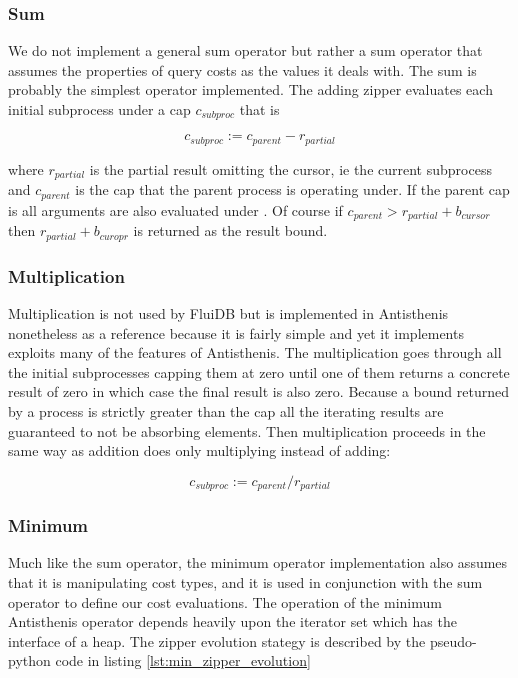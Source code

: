 \subsubsection{Sum}

We do not implement a general sum operator but rather a sum operator
that assumes the properties of query costs as the values it deals
with. The sum is probably the simplest operator implemented. The
adding zipper evaluates each initial subprocess under a cap
\(c_{subproc}\) that is

\[
c_{subproc} := c_{parent} - r_{partial}
\]

where \(r_{partial}\) is the partial result omitting the cursor, ie
the current subprocess and \(c_{parent}\) is the cap that the parent
process is operating under. If the parent cap is  all
arguments are also evaluated under . Of course if
\(c_{parent} > r_{partial} + b_{cursor}\) then \(r_{partial} +
b_{curopr}\) is returned as the result bound.

\subsubsection{Multiplication}

Multiplication is not used by FluiDB but is implemented in Antisthenis
nonetheless as a reference because it is fairly simple and yet it
implements exploits many of the features of Antisthenis. The
multiplication goes through all the initial subprocesses capping them
at zero until one of them returns a concrete result of zero in which
case the final result is also zero. Because a bound returned by a
process is strictly greater than the cap all the iterating results are
guaranteed to not be absorbing elements. Then multiplication proceeds
in the same way as addition does only multiplying instead of adding:

\[
c_{subproc} := c_{parent} / r_{partial}
\]

\subsubsection{Minimum}

Much like the sum operator, the minimum operator implementation also
assumes that it is manipulating cost types, and it is used in
conjunction with the sum operator to define our cost evaluations. The
operation of the minimum Antisthenis operator depends heavily upon the
iterator set which has the interface of a heap. The zipper evolution
stategy is described by the pseudo-python code in listing
\ref{lst:min_zipper_evolution}

